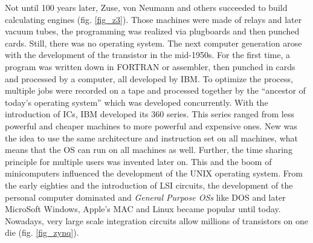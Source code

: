 Not until 100 years later, Zuse, von Neumann and others succeeded to build calculating engines (fig. \ref{fig_z3}). 
Those machines were made of relays and later vacuum tubes, the programming was realized via plugboards and then punched cards.
Still, there was no operating system.
The next computer generation arose with the development of the transistor in the mid-1950s.
For the first time, a program was written down in FORTRAN or assembler, then punched in cards and processed by a computer, all developed by IBM. 
To optimize the process, multiple jobs were recorded on a tape and processed together by the ``ancestor of today's operating system'' \cite{tanenbaum:mos} which was developed concurrently.
With the introduction of \acp{IC}, IBM developed its 360 series.
This series ranged from less powerful and cheaper machines to more powerful and expensive ones.
New was the idea to use the same architecture and instruction set on all machines, what means that the \ac{OS} can run on all machines as well.
Further, the time sharing principle for multiple users was invented later on.
This and the boom of minicomputers influenced the development of the UNIX operating system.
From the early eighties and the introduction of \ac{LSI} circuits, the development of the personal computer dominated and \textit{General Purpose \acp{OS}} like \ac{DOS} and later MicroSoft Windows, Apple's \ac{MAC} and Linux became popular until today. 
Nowadays, very large scale integration circuits allow millions of transistors on one die (fig. \ref{fig_zynq}). 

